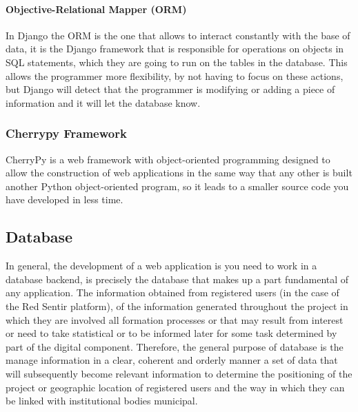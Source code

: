 \documentclass[journal,transmag]{IEEEtran}
\begin{document}
\paragraph{Objective-Relational Mapper (ORM)} 

In Django the ORM is the one that allows to interact constantly with the base of data, it is the Django framework that is responsible for operations on objects in SQL statements, which they are going to run on the tables in the database. This allows the programmer more flexibility, by not having to focus on these actions, but Django will detect that the programmer is modifying or adding a piece of information and it will let the database know.

\subsubsection{Cherrypy Framework}\label{sub:cherrypy}
CherryPy is a web framework with object-oriented programming designed to allow the construction of web applications in the same way that any other is built another Python object-oriented program, so it leads to a smaller source code you have developed in less time. 


\subsection{Database}
In general, the development of a web application is you need to work in a database backend,
is precisely the database that makes up a part fundamental of any application. The information obtained from registered users (in the case of the Red Sentir platform), of the information generated throughout the project in which they are involved all formation processes or that may result from interest or need to take statistical or to be informed later for some task determined by part of the digital component. Therefore, the general purpose of database is the manage information in a clear, coherent and orderly manner a set of data that will subsequently become relevant information to determine the positioning of the project or geographic location of registered users and the way in which they can be linked with institutional bodies municipal.
\end{document}
